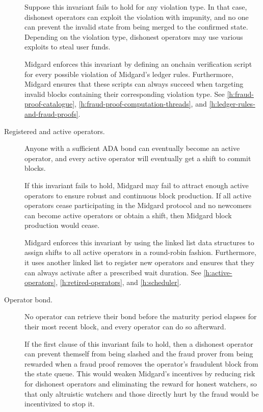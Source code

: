 \documentclass[../midgard.tex]{subfiles}
\begin{document}
\begin{description}
    Suppose this invariant fails to hold for any violation type. In that case, dishonest operators can exploit the violation with impunity, and no one can prevent the invalid state from being merged to the confirmed state.
    Depending on the violation type, dishonest operators may use various exploits to steal user funds.

    Midgard enforces this invariant by defining an onchain verification script for every possible violation of Midgard's ledger rules.
    Furthermore, Midgard ensures that these scripts can always succeed when targeting invalid blocks containing their corresponding violation type.
    See \cref{h:fraud-proof-catalogue}, \cref{h:fraud-proof-computation-threads}, and \cref{h:ledger-rules-and-fraud-proofs}.

  \item[Registered and active operators.] Anyone with a sufficient ADA bond can eventually become an active operator, and every active operator will eventually get a shift to commit blocks.

    If this invariant fails to hold, Midgard may fail to attract enough active operators to ensure robust and continuous block production.
    If all active operators cease participating in the Midgard protocol and no newcomers can become active operators or obtain a shift, then Midgard block production would cease.

    Midgard enforces this invariant by using the linked list data structures to assign shifts to all active operators in a round-robin fashion.
    Furthermore, it uses another linked list to register new operators and ensures that they can always activate after a prescribed wait duration.
    See \cref{h:active-operators}, \cref{h:retired-operators}, and \cref{h:scheduler}.

  \item[Operator bond.] No operator can retrieve their bond before the maturity period elapses for their most recent block, and every operator can do so afterward.

    If the first clause of this invariant fails to hold, then a dishonest operator can prevent themself from being slashed and the fraud prover from being rewarded when a fraud proof removes the operator's fraudulent block from the state queue.
    This would weaken Midgard's incentives by reducing risk for dishonest operators and eliminating the reward for honest watchers, so that only altruistic watchers and those directly hurt by the fraud would be incentivized to stop it.


\end{description}
\end{document}
